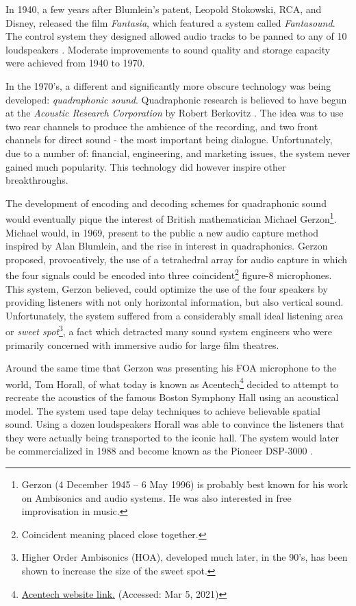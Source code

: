 In 1940, a few years after Blumlein's patent, Leopold Stokowski, RCA, and Disney, released the film \textit{Fantasia}, which featured a system called \textit{Fantasound}. The control system they designed allowed audio tracks to be panned to any of 10 loudspeakers \cite{klapholz1991fantasia}. Moderate improvements to sound quality and storage capacity were achieved from 1940 to 1970. 

In the 1970's, a different and significantly more obscure technology was being developed: \textit{quadraphonic sound}. Quadraphonic research is believed to have begun at the \textit{Acoustic Research Corporation} by Robert Berkovitz \cite{davis2003history}. The idea was to use two rear channels to produce the ambience of the recording, and two front channels for direct sound - the most important being dialogue. Unfortunately, due to a number of: financial, engineering, and marketing issues, the system never gained much popularity. This technology did however inspire other breakthroughs.

The development of encoding and decoding schemes for quadraphonic sound would eventually pique the interest of British mathematician Michael Gerzon\footnote{Gerzon (4 December 1945 – 6 May 1996) is probably best known for his work on Ambisonics and audio systems. He was also interested in free improvisation in music.}. Michael would, in 1969, present to the public a new audio capture method inspired by Alan Blumlein, and the rise in interest in quadraphonics. Gerzon proposed, provocatively, the use of a tetrahedral array for audio capture in which the four signals could be encoded into three coincident\footnote{Coincident meaning placed close together.} figure-8 microphones. This system, Gerzon believed, could optimize the use of the four speakers by providing listeners with not only horizontal information, but also vertical sound. Unfortunately, the system suffered from a considerably small ideal listening area or \textit{sweet spot}\footnote{Higher Order Ambisonics (HOA), developed much later, in the 90's, has been shown to increase the size of the sweet spot.}, a fact which detracted many sound system engineers who were primarily concerned with immersive audio for large film theatres.

Around the same time that Gerzon was presenting his FOA microphone to the world, Tom Horall, of what today is known as Acentech\footnote{\href{https://www.acentech.com/}{Acentech website link.} (Accessed: Mar 5, 2021)} decided to attempt to recreate the acoustics of the famous Boston Symphony Hall using an acoustical model. The system used tape delay techniques to achieve believable spatial sound. Using a dozen loudspeakers Horall was able to convince the listeners that they were actually being transported to the iconic hall. The system would later be commercialized in 1988 and become known as the Pioneer DSP-3000 \cite{davis2003history}. 

